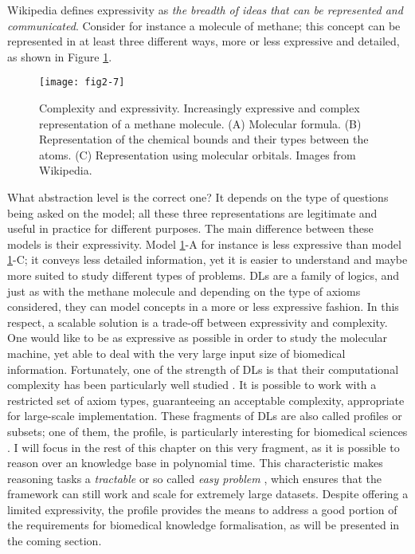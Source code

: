 Wikipedia defines expressivity as \emph{the breadth of ideas that can be represented and communicated}. Consider for instance a molecule of methane; this concept can be represented in at least three different ways, more or less expressive and detailed, as shown in Figure \ref{fig2-7}.

\begin{figure}[ht]
    \centering
    \texttt{[image: fig2-7]}
    \caption{Complexity and expressivity. Increasingly expressive and complex representation of a methane molecule. (A) Molecular formula. (B) Representation of the chemical bounds and their types between the atoms. (C) Representation using molecular orbitals. Images from Wikipedia.}
    \label{fig2-7}
\end{figure}

What abstraction level is the correct one? It depends on the type of questions being asked on the model; all these three representations are legitimate and useful in practice for different purposes. The main difference between these models is their expressivity. Model \ref{fig2-7}-A for instance is less expressive than model \ref{fig2-7}-C; it conveys less detailed information, yet it is easier to understand and maybe more suited to study different types of problems. DLs are a family of logics, and just as with the methane molecule and depending on the type of axioms considered, they can model concepts in a more or less expressive fashion.
In this respect, a scalable solution is a trade-off between expressivity and complexity. One would like to be as expressive as possible in order to study the molecular machine, yet able to deal with the very large input size of biomedical information. Fortunately, one of the strength of DLs is that their computational complexity has been particularly well studied \citep{computationalprop} \citep{ter2005completeness}. It is possible to work with a restricted set of axiom types, guaranteeing an acceptable complexity, appropriate for large-scale implementation. These fragments of DLs are also called profiles or subsets; one of them, the  profile, is particularly interesting for biomedical sciences \citep{baader2005pushing} \citep{baader2008pushing} \citep{hoehndorf2011common}. I will focus in the rest of this chapter on this very fragment, as it is possible to reason over an  knowledge base in polynomial time. This characteristic makes reasoning tasks a \emph{tractable} or so called \emph{easy problem} \citep{cobham1965intrinsic}, which ensures that the framework can still work and scale for extremely large datasets. Despite offering a limited expressivity, the  profile provides the means to address a good portion of the requirements for biomedical knowledge formalisation, as will be presented in the coming section.

